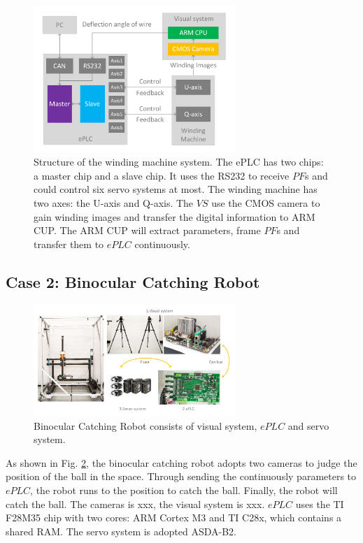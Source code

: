 \documentclass[journal,UTF8]{IEEEtran}
\begin{document}
\begin{figure}
	\centering
	\includegraphics[width=3in]{fig/WindingSystem.pdf}
	\caption{ Structure of the winding machine system. The ePLC has two chips: a master chip and a slave chip. It uses the RS232 to receive $PF$s and could control six servo systems at most. The winding machine has two axes: the U-axis and Q-axis. The $VS$ use the CMOS camera to gain winding images and transfer the digital information to ARM CUP. The ARM CUP will extract parameters, frame $PF$s and transfer them to $ePLC$ continuously.}
	\label{fig:WindingSystem}
\end{figure}
\subsection{Case 2: Binocular Catching Robot}
\begin{figure}
	\centering
	\includegraphics[width=3in]{fig/robot.pdf}
	\caption{ Binocular Catching Robot consists of visual system, $ePLC$ and servo system.}
	\label{fig:robot}
\end{figure}
As shown in Fig. \ref{fig:robot}, the binocular catching robot adopts two cameras to judge the position of the ball in the space. Through sending the continuously parameters to $ePLC$, the robot runs to the position to catch the ball. Finally, the robot will catch the ball. The cameras is xxx, the visual system is xxx. $ePLC$ uses the TI F28M35 chip with two cores: ARM Cortex M3 and TI C28x, which contains a shared RAM. The servo system is adopted ASDA-B2. 
\end{document}
